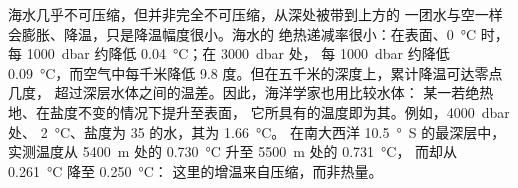 海水几乎不可压缩，但并非完全不可压缩，从深处被带到上方的
一团水与空一样会膨胀、降温，只是降温幅度很小。海水的
绝热递减率很小：在表面、\qty{0}{\celsius} 时，每
\qty{1000}{dbar} 约降低 \qty{0.04}{\celsius}；在 \qty{3000}{dbar} 处，
每 \qty{1000}{dbar} 约降低 \qty{0.09}{\celsius}，而空气中每千米降低
\num{9.8} 度。但在五千米的深度上，累计降温可达零点几度，
超过深层水体之间的温差。因此，海洋学家也用\emph{}比较水体：
某一若绝热地、在盐度不变的情况下提升至表面，
它所具有的温度即为其。例如，\qty{4000}{dbar} 处、
\qty{2}{\celsius}、盐度为 35 的水，其为 \qty{1.66}{\celsius}。
在南大西洋 \qty{10.5}{\degree S} 的最深层中，实测温度从
\qty{5400}{m} 处的 \qty{0.730}{\celsius} 升至
\qty{5500}{m} 处的 \qty{0.731}{\celsius}，
而却从 \qty{0.261}{\celsius} 降至 \qty{0.250}{\celsius}：
这里的增温来自压缩，而非热量。

